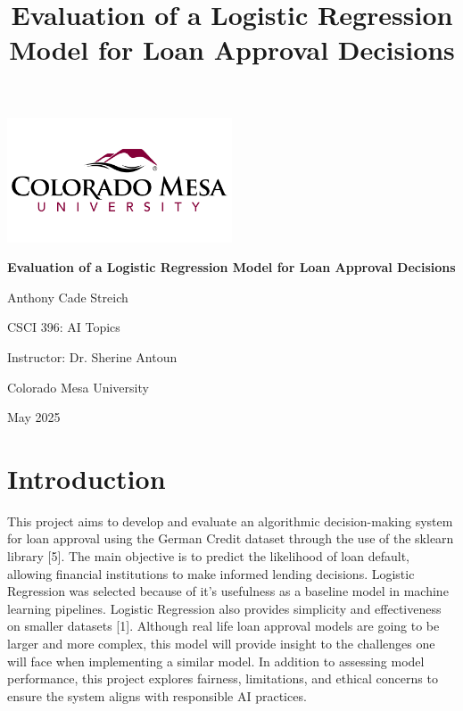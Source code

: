 \documentclass[12pt]{article}
\title{Evaluation of a Logistic Regression Model for Loan Approval Decisions}
\author{}
\date{}
\begin{document}
	
	\begin{titlepage}
	\centering
	\vspace*{2cm}
	
	\includegraphics[width=0.5\textwidth]{CMU Logo}
	\vspace{1cm}
	
	{\Huge \bfseries Evaluation of a Logistic Regression Model for Loan Approval Decisions \par}
	\vspace{1.5cm}
	
	{\Large Anthony Cade Streich \par}
	\vspace{0.5cm}
	
	CSCI 396: AI Topics \par
	Instructor: Dr. Sherine Antoun \par
	Colorado Mesa University \par
	\vfill
	
	{\large May 2025 \par}
	\end{titlepage}
	
	\section{Introduction}
	This project aims to develop and evaluate an algorithmic decision-making system for loan approval using the German Credit dataset through the use of the sklearn library [5]. The main objective is to predict the likelihood of loan default, allowing financial institutions to make informed lending decisions. Logistic Regression was selected because of it's usefulness as a baseline model in machine learning pipelines. Logistic Regression also provides simplicity and effectiveness on smaller datasets [1].  Although real life loan approval models are going to be larger and more complex, this model will provide insight to the challenges one will face when implementing a similar model. In addition to assessing model performance, this project explores fairness, limitations, and ethical concerns to ensure the system aligns with responsible AI practices.
	
\end{document}
